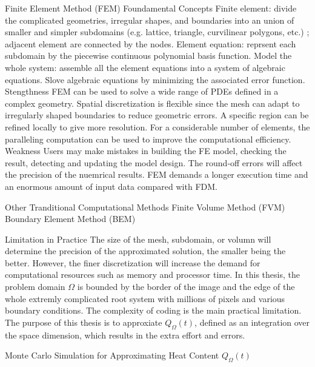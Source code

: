 \documentclass{article}
\begin{document}
\begin{outline}[enumerate]
    \2 Finite Element Method (FEM) \cite{zlamal1968finite}
      \3 Foundamental Concepts 
         \4 Finite element: divide the complicated geometries, irregular shapes, and boundaries into an union of smaller and simpler subdomains (e.g. lattice, triangle, curvilinear polygons, etc.) \cite{logan2011first}; adjacent element are connected by the nodes.
         \4 Element equation: reprsent each subdomain by the piecewise continuous polynomial basis function.
         \4 Model the whole system: assemble all the element equations into a system of algebraic equations.
         \4 Slove algebraic equations by minimizing the associated error function.
      \3 Stengthness
         \4 FEM can be used to solve a wide range of PDEs defined in a complex geometry.
         \4 Spatial discretization is flexible since the mesh can adapt to irregularly shaped boundaries to reduce geometric errors.
         \4 A specific region can be refined locally to give more resolution.
         \4 For a considerable number of elements, the paralleling computation can be used to improve the computational efficiency.
      \3 Weakness
         \4 Users may make mistakes in building the FE model, checking the result, detecting and updating the model design.
         \4 The round-off errors will affect the precision of the nuemrical results.
         \4 FEM demands a longer execution time and an enormous amount of input data compared with FDM.
      
    \2 Other Tranditional Computational Methods
      \3 Finite Volume Method (FVM) \cite{eymard2000finite}
      \3 Boundary Element Method (BEM) \cite{attaway1991boundary}
      
    \2 Limitation in Practice  
      \3 The size of the mesh, subdomain, or volumn will determine the precision of the approximated solution, the smaller being the better. However, the finer discretization will increase the demand for computational resources such as memory and processor time.
      \3 In this thesis, the problem domain $\Omega$ is bounded by the border of the image and the edge of the whole extremly complicated root system with millions of pixels and various boundary conditions. The complexity of coding is the main practical limitation.
      \3 The purpose of this thesis is to approxiate $Q_{\Omega}(t)$, defined as an integration over the space dimension, which results in the extra effort and errors.
        

    \newpage


  \1 Monte Carlo Simulation for Approximating Heat Content $Q_{\Omega}(t)$


\end{outline}
\end{document}
